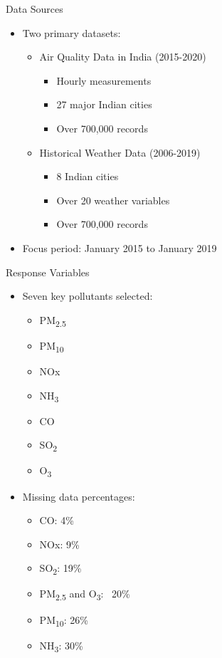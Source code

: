 \documentclass[svgnames, 10pt]{beamer}
\begin{document}
\begin{frame}{Data Sources}
\begin{itemize}
    \item Two primary datasets:
        \begin{itemize}
            \item Air Quality Data in India (2015-2020)
                \begin{itemize}
                    \item Hourly measurements
                    \item 27 major Indian cities
                    \item Over 700,000 records
                \end{itemize}
            \item Historical Weather Data (2006-2019)
                \begin{itemize}
                    \item 8 Indian cities
                    \item Over 20 weather variables
                    \item Over 700,000 records
                \end{itemize}
        \end{itemize}
    \item Focus period: January 2015 to January 2019
\end{itemize}
\end{frame}

\begin{frame}{Response Variables}
\begin{itemize}
    \item Seven key pollutants selected:
        \begin{itemize}
            \item PM\textsubscript{2.5}
            \item PM\textsubscript{10}
            \item NOx
            \item NH\textsubscript{3}
            \item CO
            \item SO\textsubscript{2}
            \item O\textsubscript{3}
        \end{itemize}
    \item Missing data percentages:
        \begin{itemize}
            \item CO: 4\%
            \item NOx: 9\%
            \item SO\textsubscript{2}: 19\%
            \item PM\textsubscript{2.5} and O\textsubscript{3}: ~20\%
            \item PM\textsubscript{10}: 26\%
            \item NH\textsubscript{3}: 30\%
        \end{itemize}
\end{itemize}
\end{frame}
\end{document}
